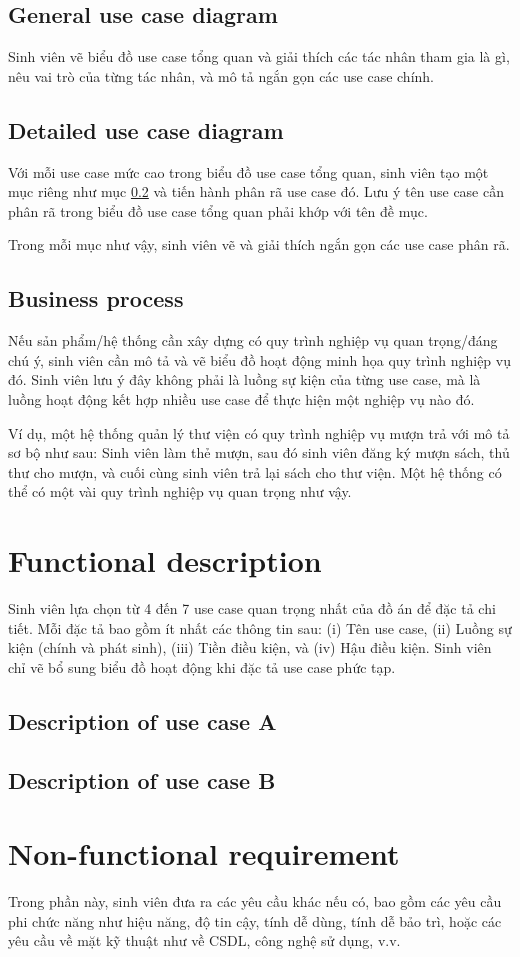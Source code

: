 \documentclass[../Main.tex]{subfiles}
\begin{document}
\subsection{General use case diagram}
\label{subsection:2.2.1}
Sinh viên vẽ biểu đồ use case tổng quan và giải thích các tác nhân tham gia là gì, nêu vai trò của từng tác nhân, và mô tả ngắn gọn các use case chính.

\subsection{Detailed use case diagram}
\label{subsection:2.2.2}
Với mỗi use case mức cao trong biểu đồ use case tổng quan, sinh viên tạo một mục riêng như mục \ref{subsection:2.2.2} và tiến hành phân rã use case đó.
Lưu ý tên use case cần phân rã trong biểu đồ use case tổng quan phải khớp với tên đề mục.

Trong mỗi mục như vậy, sinh viên vẽ và giải thích ngắn gọn các use case phân rã.

\subsection{Business process}
\label{subsection:2.2.3}
Nếu sản phẩm/hệ thống cần xây dựng có quy trình nghiệp vụ quan trọng/đáng chú ý, sinh viên cần mô tả và vẽ biểu đồ hoạt động minh họa quy trình nghiệp vụ đó.
Sinh viên lưu ý đây không phải là luồng sự kiện của từng use case, mà là luồng hoạt động kết hợp nhiều use case để thực hiện một nghiệp vụ nào đó.

Ví dụ, một hệ thống quản lý thư viện có quy trình nghiệp vụ mượn trả với mô tả sơ bộ như sau: Sinh viên làm thẻ mượn, sau đó sinh viên đăng ký mượn sách, thủ thư cho mượn, và cuối cùng sinh viên trả lại sách cho thư viện.
Một hệ thống có thể có một vài quy trình nghiệp vụ quan trọng như vậy.
\section{Functional description}
\label{section:2.3}
Sinh viên lựa chọn từ 4 đến 7 use case quan trọng nhất của đồ án để đặc tả chi tiết.
Mỗi đặc tả bao gồm ít nhất các thông tin sau: (i) Tên use case, (ii) Luồng sự kiện (chính và phát sinh), (iii) Tiền điều kiện, và (iv) Hậu điều kiện.
Sinh viên chỉ vẽ bổ sung biểu đồ hoạt động khi đặc tả use case phức tạp.
\subsection{Description of use case A}
\hfill
\subsection{Description of use case B}
\hfill

\section{Non-functional requirement}
\label{section:2.4}
Trong phần này, sinh viên đưa ra các yêu cầu khác nếu có, bao gồm các yêu cầu phi chức năng như hiệu năng, độ tin cậy, tính dễ dùng, tính dễ bảo trì, hoặc các yêu cầu về mặt kỹ thuật như về CSDL, công nghệ sử dụng, v.v.

\end{document}
